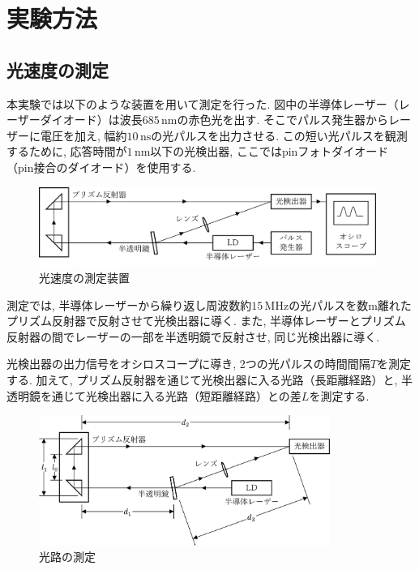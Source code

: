 \documentclass{jarticle}
\begin{document}
\section{実験方法}


\subsection{光速度の測定}

本実験では以下のような装置を用いて測定を行った.
図中の半導体レーザー（レーザーダイオード）は波長$685\,\mathrm{nm}$の赤色光を出す.
そこでパルス発生器からレーザーに電圧を加え, 幅約$10\,\mathrm{ns}$の光パルスを出力させる.
この短い光パルスを観測するために, 応答時間が$1\,\mathrm{nm}$以下の光検出器, ここではpinフォトダイオード（pin接合のダイオード）を使用する.

\begin{figure}[H]
  \begin{center}
    \includegraphics[width=110mm]{experimental_method_picture.png}
    \caption{光速度の測定装置}
  \end{center}
\end{figure}

測定では, 半導体レーザーから繰り返し周波数約$15\,\mathrm{MHz}$の光パルスを数$\mathrm{m}$離れたプリズム反射器で反射させて光検出器に導く.
また, 半導体レーザーとプリズム反射器の間でレーザーの一部を半透明鏡で反射させ, 同じ光検出器に導く.

光検出器の出力信号をオシロスコープに導き, 2つの光パルスの時間間隔$T$を測定する.
加えて, プリズム反射器を通じて光検出器に入る光路（長距離経路）と, 半透明鏡を通じて光検出器に入る光路（短距離経路）との差$L$を測定する.

\begin{figure}[H]
  \begin{center}
    \includegraphics[width=95mm]{experimental_distance_picture.png}
    \caption{光路の測定}
  \end{center}
\end{figure}
\end{document}
